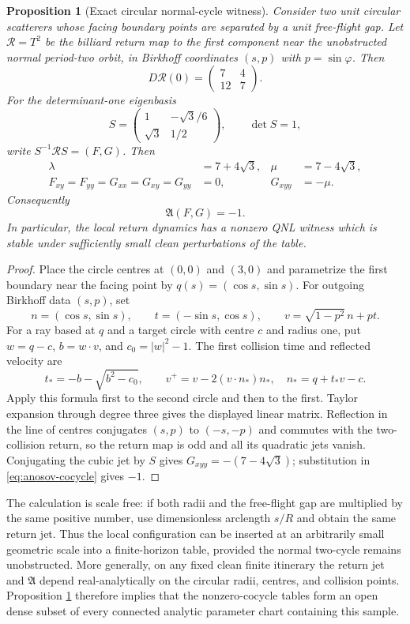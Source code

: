 \documentclass[11pt]{article}
\newtheorem{proposition}[theorem]{Proposition}
\begin{document}
\begin{proposition}[Exact circular normal-cycle witness]
\label{prop:exact-circular-anosov}
Consider two unit circular scatterers whose facing boundary points are
separated by a unit free-flight gap.  Let $\mathcal R=T^2$ be the billiard
return map to the first component near the unobstructed normal period-two
orbit, in Birkhoff coordinates $(s,p)$ with $p=\sin\varphi$.  Then
\[
 D\mathcal R(0)=
 \begin{pmatrix}7&4\\12&7\end{pmatrix}.
\]
For the determinant-one eigenbasis
\[
 S=\begin{pmatrix}
       1&-\sqrt3/6\\[2pt]
       \sqrt3&1/2
    \end{pmatrix},
 \qquad \det S=1,
\]
write $S^{-1}\mathcal R S=(F,G)$.  Then
\begin{align*}
 \lambda&=7+4\sqrt3,&\mu&=7-4\sqrt3,\\
 F_{xy}=F_{yy}=G_{xx}=G_{xy}=G_{yy}&=0,
 &G_{xyy}&=-\mu.
\end{align*}
Consequently
\[
 \mathfrak A(F,G)=-1.
\]
In particular, the local return dynamics has a nonzero QNL witness which is
stable under sufficiently small clean perturbations of the table.
\end{proposition}

\begin{proof}
Place the circle centres at $(0,0)$ and $(3,0)$ and parametrize the first
boundary near the facing point by $q(s)=(\cos s,\sin s)$.  For outgoing
Birkhoff data $(s,p)$, set
\[
 n=(\cos s,\sin s),\qquad t=(-\sin s,\cos s),\qquad
 v=\sqrt{1-p^2}\,n+pt.
\]
For a ray based at $q$ and a target circle with centre $c$ and radius one,
put $w=q-c$, $b=w\cdot v$, and $c_0=|w|^2-1$.  The first collision time and
reflected velocity are
\[
 t_*=-b-\sqrt{b^2-c_0},\qquad
 v^+=v-2(v\cdot n_*)n_*,
 \quad n_*=q+t_*v-c.
\]
Apply this formula first to the second circle and then to the first.  Taylor
expansion through degree three gives the displayed linear matrix.  Reflection
in the line of centres conjugates $(s,p)$ to $(-s,-p)$ and commutes with the
two-collision return, so the return map is odd and all its quadratic jets
vanish.  Conjugating the cubic jet by $S$ gives
$G_{xyy}=-(7-4\sqrt3)$; substitution in
\eqref{eq:anosov-cocycle} gives $-1$.
\end{proof}

The calculation is scale free: if both radii and the free-flight gap are
multiplied by the same positive number, use dimensionless arclength $s/R$ and
obtain the same return jet.  Thus the local configuration can be inserted at
an arbitrarily small geometric scale into a finite-horizon table, provided
the normal two-cycle remains unobstructed.  More generally, on any fixed clean
finite itinerary the return jet and $\mathfrak A$ depend real-analytically on
the circular radii, centres, and collision points.  Proposition
\ref{prop:exact-circular-anosov} therefore implies that the nonzero-cocycle
tables form an open dense subset of every connected analytic parameter chart
containing this sample.
\end{document}
